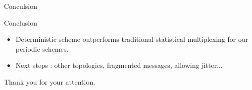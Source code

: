 \documentclass[10 pt]{beamer}
\begin{document}
\begin{section}{Conculsion}
\begin{frame}{Conclusion}
\begin{itemize}
\item Deterministic scheme outperforms traditional statistical multiplexing for our periodic schemes.
\vspace{1cm}
\item Next steps :  other topologies, fragmented messages, allowing jitter...

\end{itemize}
\vspace{0.5cm}



\end{frame}

\begin{frame}
Thank you for your attention.

\end{frame}
\end{section}
\end{document}
